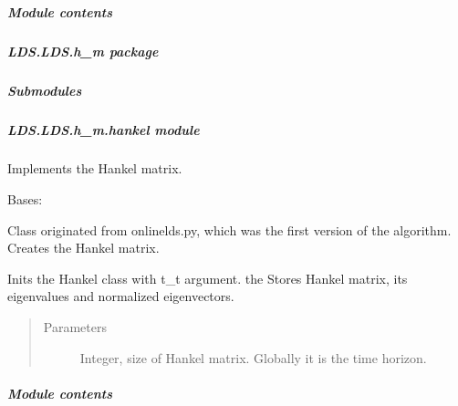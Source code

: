 \documentclass[letterpaper,10pt,english]{sphinxmanual}
\begin{document}
\subparagraph{Module contents}
\label{\detokenize{LDS.LDS.filters:module-LDS.LDS.filters}}\label{\detokenize{LDS.LDS.filters:module-contents}}

\subparagraph{LDS.LDS.h\_m package}
\label{\detokenize{LDS.LDS.h_m:lds-lds-h-m-package}}\label{\detokenize{LDS.LDS.h_m::doc}}

\subparagraph{Submodules}
\label{\detokenize{LDS.LDS.h_m:submodules}}

\subparagraph{LDS.LDS.h\_m.hankel module}
\label{\detokenize{LDS.LDS.h_m:module-LDS.LDS.h_m.hankel}}\label{\detokenize{LDS.LDS.h_m:lds-lds-h-m-hankel-module}}
\sphinxAtStartPar
Implements the Hankel matrix.

\begin{fulllineitems}
\label{\detokenize{LDS.LDS.h_m:LDS.LDS.h_m.hankel.Hankel}}
\sphinxAtStartPar
Bases: 

\sphinxAtStartPar
Class originated from onlinelds.py, which
was the first version of the algorithm.
Creates the Hankel matrix.

\sphinxAtStartPar
Inits the Hankel class with t\_t argument. the Stores Hankel matrix, its eigenvalues
and normalized eigenvectors.
\begin{quote}\begin{description}
\item[{Parameters}] \leavevmode
\sphinxAtStartPar
{} \textendash{} Integer, size of Hankel matrix. Globally it is the time horizon.

\end{description}\end{quote}

\end{fulllineitems}



\subparagraph{Module contents}
\label{\detokenize{LDS.LDS.h_m:module-LDS.LDS.h_m}}\label{\detokenize{LDS.LDS.h_m:module-contents}}
\end{document}

